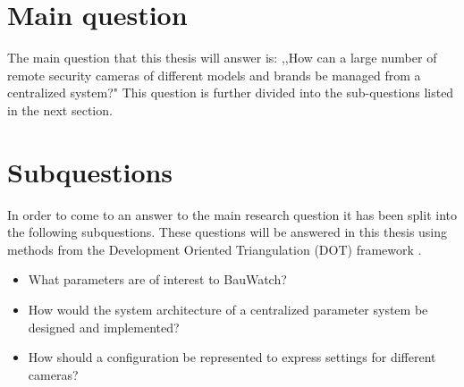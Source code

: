 
\section{Main question}
The main question that this thesis will answer is: ,,How can a large number of remote security cameras of different models and brands be managed from a centralized system?"
This question is further divided into the sub-questions listed in the next section.

\section{Subquestions}
In order to come to an answer to the main research question it has been split into the following subquestions.
These questions will be answered in this thesis using methods from the Development Oriented Triangulation (DOT) framework \cite{noauthor_dot_nodate}.
\begin{itemize}
	\item What parameters are of interest to BauWatch?
	\item How would the system architecture of a centralized parameter system be designed and implemented?
	\item How should a configuration be represented to express settings for different cameras?
\end{itemize}

